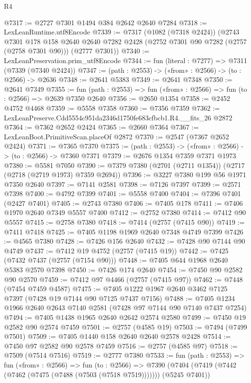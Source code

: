 \begin{lexlean}{R4}
\begin{coremodule}
@7317 := @2727 @7301 @1494 @384 @2642 @2640 @7284
@7318 := LexLeanRuntime.utf8Encode
@7339 := @7317
    (@1082 (@7318 @2424))
    (@2743
      @7301
      @178
      @158
      @2640
      @2640
      @7282
      @2428
      (@2752 @7301 @90 @7282 (@2757 (@2758 @7301 @90)))
      (@2777 @7301))
@7340 := LexLeanPreservation.prim_utf8Encode
@7344 := fun (literal : @7277) => @7311 (@7339 (@7340 @2424))
@7347 := (path : @2553) -> («from» : @2566) -> (to : @2566) -> @2636
@7348 := @2641 @5383
@7349 := @2641 @7348
@7350 := @2641 @7349
@7355 := fun (path : @2553) => fun («from» : @2566) => fun (to : @2566) => @2639 @7350 @2640
@7356 := @2650 @1354
@7358 := @2452 @4752 @4468
@7359 := @5558 @7358
@7360 := @7356 @7359
@7362 := LexLeanPreserve.Cdd5554c951da2346d1750fe683cfbcb1.R4.__fits_26 @2872
@7364 := @7362 @2652 @2424
@7365 := @2660 @7364
@7367 := LexLeanBoot.PrimitiveScan.placeOf @2872
@7370 := @2547 (@7367 @2652 @2424)
@7371 := @7365 @7370
@7375 := (path : @2553) -> («from» : @2566) -> (to : @2566) -> @7360 @7371
@7379 := @2676 @1354 @7359 @7371 @1973
@7380 := @5581 @7050
@7390 := @7379 @7380 (@2701 (@2711 @1354)) (@2717 (@2718 (@2719 @1973) @7359 @2694))
@7396 := @3227 @7380 @199 @56 @1971 @7350 @2640
@7397 := @7141 @2581
@7398 := @7126 @7397
@7399 := @2571 @7398
@7400 := @4792 @7399
@7401 := @5558 @7400
@7404 := @7396 @7401 (@2427 @7401)
@7405 := @2743 @7380
@7406 := @7405 @178
@7411 := @7406 @1970 @2640 @7349 @5557 @7400
@7412 := @2752 @7380
@7414 := @7412 @90 @5557
@7415 := @2758 @7380
@7418 := @7414 (@2757 (@7415 @90))
@7419 := @7411 @7418
@7425 := @7405 @1198 @1969 @2640 @7348 @4749 @7399
@7426 := @4565 @7380
@7428 := @7426 @156 @2640
@7432 := @7428 @90 @7144 @90 @4749
@7437 := @7412 @19 @4752 (@2757 (@7415 @19))
@7442 := @7425 (@7432 @7437 (@2757 (@7154 @90)))
@7448 := @7405 @644 @1968 @2640 @5383 @2570 @7398
@7450 := @7426 @174 @2640
@7454 := @7450 @90 @2582 @90 @2570
@7459 := @7412 @97 @4466 (@2757 (@7415 @97))
@7462 := @7448 (@7454 @7459 @4587)
@7475 := @7405 @1222 @1967 @2640 @3462 @7125 @7397 (@7428 @19 @7144 @90 @7125 @7437 @7156)
@7488 := @7405 @1234 @1966 @2640 @2643 @7140 @2581 (@7428 @97 @7144 @90 @7140 @7437 @7254)
@7494 := @7405 @1438 @1965 @2640 @2642 @2574 @2580
@7499 := @7450 @19 @2582 @90 @2574 @7459
@7501 := @2757 (@4585 @19)
@7503 := @7494 (@7499 @7501)
@7509 := @7405 @1440 @158 @2640 @2640 @2578 @2428
@7514 := @7450 @97 @2582 @90 @2578 @7459
@7516 := @2757 (@4585 @97)
@7518 := @7509 (@7514 @7516)
@7519 := @2777 @7380
@7533 := fun (path : @2553) =>
  fun («from» : @2566) =>
  fun (to : @2566) =>
  @7390 (@7404 (@7419 (@7442 (@7462 (@7475 (@7488 (@7503 (@7518 @7519))))))) (@5245 @7401))

\end{coremodule}
\end{lexlean}
